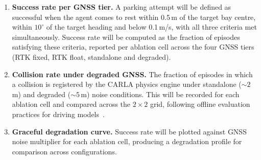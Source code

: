 \documentclass{sig-alternate}
\makeatletter
\renewcommand\section{\@startsection{section}{1}{\z@}%
    {-10\p@ \@plus -4\p@ \@minus -2\p@}%
    {16\p@}%
    {\baselineskip 14pt\secfnt\@ucheadtrue}}
\makeatother
\begin{document}
\begin{enumerate}

    \item \textbf{Success rate per GNSS tier.} A parking attempt will be defined as successful when the agent comes to rest within 0.5\,m of the target bay centre, within $10^\circ$ of the target heading and below 0.1\,m/s, with all three criteria met simultaneously. Success rate will be computed as the fraction of episodes satisfying these criteria, reported per ablation cell across the four GNSS tiers (RTK fixed, RTK float, standalone and degraded).

    \item \textbf{Collision rate under degraded GNSS.} The fraction of episodes in which a collision is registered by the CARLA physics engine under standalone (${\sim}2$\,m) and degraded (${\sim}5$\,m) noise conditions. This will be recorded for each ablation cell and compared across the $2 \times 2$ grid, following offline evaluation practices for driving models~\cite{codevilla2018offline}.

    \item \textbf{Graceful degradation curve.} Success rate will be plotted against GNSS noise multiplier for each ablation cell, producing a degradation profile for comparison across configurations.

\end{enumerate}



\end{document}
